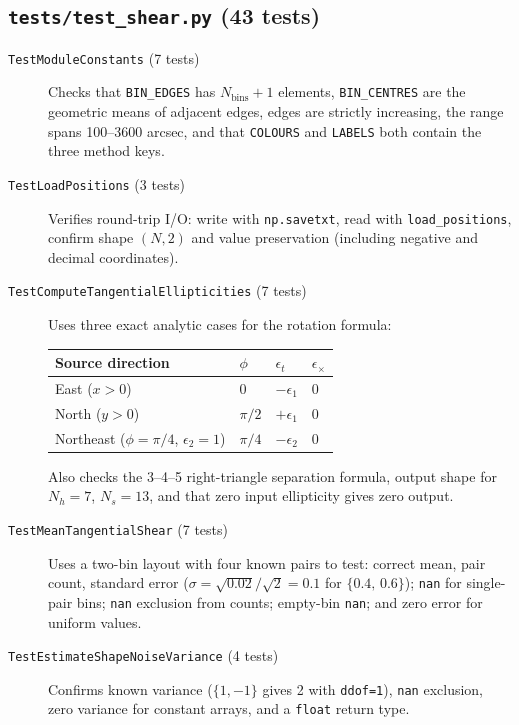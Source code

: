 \subsection{\texttt{tests/test\_shear.py} (43 tests)}

\begin{description}
  \item[\texttt{TestModuleConstants} (7 tests)]
    Checks that \texttt{BIN\_EDGES} has $N_\mathrm{bins}+1$ elements,
    \texttt{BIN\_CENTRES} are the geometric means of adjacent edges, edges are
    strictly increasing, the range spans 100--3600 arcsec, and that
    \texttt{COLOURS} and \texttt{LABELS} both contain the three method keys.

  \item[\texttt{TestLoadPositions} (3 tests)]
    Verifies round-trip I/O: write with \texttt{np.savetxt}, read with
    \texttt{load\_positions}, confirm shape $(N, 2)$ and value preservation
    (including negative and decimal coordinates).

  \item[\texttt{TestComputeTangentialEllipticities} (7 tests)]
    Uses three exact analytic cases for the rotation formula:
    \begin{center}
    \begin{tabular}{llll}
    \hline
    Source direction & $\phi$ & $\epsilon_t$ & $\epsilon_\times$ \\
    \hline
    East ($x > 0$) & $0$ & $-\epsilon_1$ & $0$ \\
    North ($y > 0$) & $\pi/2$ & $+\epsilon_1$ & $0$ \\
    Northeast ($\phi = \pi/4$, $\epsilon_2 = 1$) & $\pi/4$ & $-\epsilon_2$ & $0$ \\
    \hline
    \end{tabular}
    \end{center}
    Also checks the 3--4--5 right-triangle separation formula, output shape for
    $N_h = 7$, $N_s = 13$, and that zero input ellipticity gives zero output.

  \item[\texttt{TestMeanTangentialShear} (7 tests)]
    Uses a two-bin layout with four known pairs to test: correct mean, pair
    count, standard error ($\sigma = \sqrt{0.02}/\sqrt{2} = 0.1$ for
    $\{0.4,\,0.6\}$); \texttt{nan} for single-pair bins; \texttt{nan} exclusion
    from counts; empty-bin \texttt{nan}; and zero error for uniform values.

  \item[\texttt{TestEstimateShapeNoiseVariance} (4 tests)]
    Confirms known variance ($\{1,{-}1\}$ gives 2 with \texttt{ddof=1}),
    \texttt{nan} exclusion, zero variance for constant arrays, and a
    \texttt{float} return type.


\end{description}
